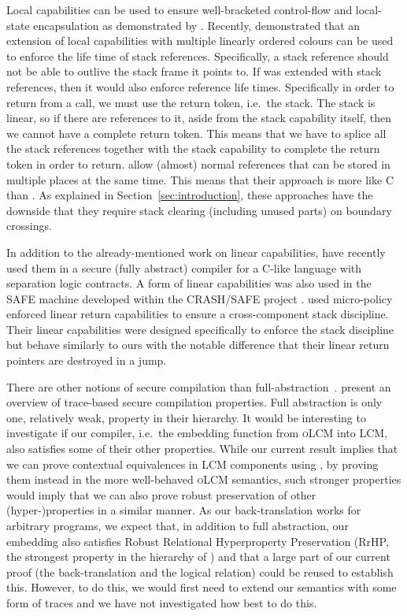 \documentclass{jfp}
\newcommand{\trgcm}{\textsc{LCM}}
\newcommand{\srccm}{\textsc{oLCM}}
\begin{document}
Local capabilities can be used to ensure well-bracketed control-flow and local-state encapsulation as demonstrated by \citet{skorstengaard_reasoning_2017}.
Recently, \citet{tsampas_2019} demonstrated that an extension of local capabilities with multiple linearly ordered colours can be used to enforce the life time of stack references.
Specifically, a stack reference should not be able to outlive the stack frame it points to.
If \stktokens{} was extended with stack references, then it would also enforce reference life times.
Specifically in order to return from a call, we must use the return token, i.e.\ the stack.
The stack is linear, so if there are references to it, aside from the stack capability itself, then we cannot have a complete return token.
This means that we have to splice all the stack references together with the stack capability to complete the return token in order to return.
\citet{tsampas_2019} allow (almost) normal references that can be stored in multiple places at the same time.
This means that their approach is more like C than \stktokens{}.
As explained in Section~\ref{sec:introduction}, these approaches have the downside that they require stack clearing (including unused parts) on boundary crossings.

In addition to the already-mentioned work on linear capabilities, \citet{van_strydonck_linear_2019} have recently used them in a secure (fully abstract) compiler for a C-like language with separation logic contracts.
A form of linear capabilities was also used in the SAFE machine developed within the CRASH/SAFE project \citep{DBLP:conf/sp/AmorimDGHPST15,DBLP:journals/jcs/AmorimCDDHPPPT16}.
\citet{Abate:2018:GCG:3243734.3243745} used micro-policy enforced linear return capabilities to ensure a cross-component stack discipline.
Their linear capabilities were designed specifically to enforce the stack discipline but behave similarly to ours with the notable difference that their linear return pointers are destroyed in a jump.

There are other notions of secure compilation than full-abstraction~\citep{abadi_protection_1998}.
\citet{abate_2019} present an overview of trace-based secure compilation properties.
Full abstraction is only one, relatively weak, property in their hierarchy.
It would be interesting to investigate if our compiler, i.e.\ the embedding function from \srccm{} into \trgcm{}, also satisfies some of their other properties.
While our current result implies that we can prove contextual equivalences in \trgcm{} components using \stktokens{}, by proving them instead in the more well-behaved \srccm{} semantics, such stronger properties would imply that we can also prove robust preservation of other (hyper-)properties in a similar manner.
As our back-translation works for arbitrary programs, we expect that, in addition to full abstraction, our embedding also satisfies Robust Relational Hyperproperty Preservation (RrHP, the strongest property in the hierarchy of \citeauthor{abate_2019}) and that a large part of our current proof (the back-translation and the logical relation) could be reused to establish this.
However, to do this, we would first need to extend our semantics with some form of traces and we have not investigated how best to do this. 
\end{document}
